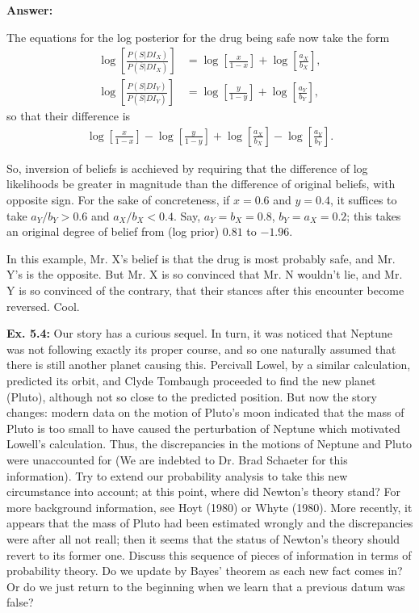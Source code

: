\documentclass{article}
\begin{document}
\textbf{Answer:}

The equations for the log posterior for the drug being safe now take the form
\begin{align*}
	\log\left[\frac{P(S|DI_X)}{P(\overline{S}|DI_X)}\right]&=\log\left[\frac{x}{1-x}\right]+\log\left[\frac{a_X}{b_X}\right],\\
	\log\left[\frac{P(S|DI_Y)}{P(\overline{S}|DI_Y)}\right]&=\log\left[\frac{y}{1-y}\right]+\log\left[\frac{a_Y}{b_Y}\right],
\end{align*}
so that their difference is
\begin{align*}
	\log\left[\frac{x}{1-x}\right]-\log\left[\frac{y}{1-y}\right]+\log\left[\frac{a_X}{b_X}\right]-\log\left[\frac{a_Y}{b_Y}\right].
\end{align*}

So, inversion of beliefs is acchieved by requiring that the difference of log likelihoods be greater in magnitude than the difference of original beliefs, with opposite sign. For the sake of concreteness, if $x=0.6$ and $y=0.4$, it suffices to take $a_Y/b_Y>0.6$ and $a_X/b_X<0.4$. Say, $a_Y=b_X=0.8$, $b_Y=a_X=0.2$; this takes an original degree of belief from (log prior) $0.81$ to $-1.96$.

In this example, Mr. X's belief is that the drug is most probably safe, and Mr. Y's is the opposite. But Mr. X is so convinced that Mr. N wouldn't lie, and Mr. Y is so convinced of the contrary, that their stances after this encounter become reversed. Cool.

\textbf{Ex. 5.4: }Our story has a curious sequel. In turn, it was noticed that Neptune was not following exactly its proper course, and so one naturally assumed that there is still another planet causing this. Percivall Lowel, by a similar calculation, predicted its orbit, and Clyde Tombaugh proceeded to find the new planet (Pluto), although not so close to the predicted position. But now the story changes: modern data on the motion of Pluto's moon indicated that the mass of Pluto is too small to have caused the perturbation of Neptune which motivated Lowell's calculation. Thus, the discrepancies in the motions of Neptune and Pluto were unaccounted for (We are indebted to Dr. Brad Schaeter for this information). Try to extend our probability analysis to take this new circumstance into account; at this point, where did Newton's theory stand? For more background information, see Hoyt (1980) or Whyte (1980). More recently, it appears that the mass of Pluto had been estimated wrongly and the discrepancies were after all not reall; then it seems that the status of Newton's theory should revert to its former one. Discuss this sequence of pieces of information in terms of probability theory. Do we update by Bayes' theorem as each new fact comes in? Or do we just return to the beginning when we learn that a previous datum was false?
\end{document}
